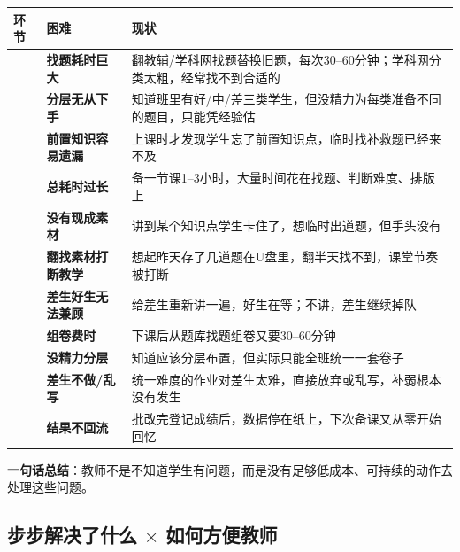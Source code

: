 \documentclass[11pt,a4paper]{article}
\begin{document}
\begin{center}\small
\begin{tabularx}{\textwidth}{>{\bfseries}l >{\bfseries}l Y}
\toprule
{}\textbf{环节} & \textbf{困难} & \textbf{现状} \\
\midrule
{} & 找题耗时巨大 & 翻教辅/学科网找题替换旧题，每次30--60分钟；学科网分类太粗，经常找不到合适的 \\
 & 分层无从下手 & 知道班里有好/中/差三类学生，但没精力为每类准备不同的题目，只能凭经验估 \\
 & 前置知识容易遗漏 & 上课时才发现学生忘了前置知识点，临时找补救题已经来不及 \\
 & 总耗时过长 & 备一节课1--3小时，大量时间花在找题、判断难度、排版上 \\
\midrule
{} & 没有现成素材 & 讲到某个知识点学生卡住了，想临时出道题，但手头没有 \\
 & 翻找素材打断教学 & 想起昨天存了几道题在U盘里，翻半天找不到，课堂节奏被打断 \\
 & 差生好生无法兼顾 & 给差生重新讲一遍，好生在等；不讲，差生继续掉队 \\
\midrule
{} & 组卷费时 & 下课后从题库找题组卷又要30--60分钟 \\
 & 没精力分层 & 知道应该分层布置，但实际只能全班统一一套卷子 \\
 & 差生不做/乱写 & 统一难度的作业对差生太难，直接放弃或乱写，补弱根本没有发生 \\
 & 结果不回流 & 批改完登记成绩后，数据停在纸上，下次备课又从零开始回忆 \\
\bottomrule
\end{tabularx}
\end{center}

\begin{notebox}
\textbf{一句话总结}：教师不是不知道学生有问题，而是没有足够低成本、可持续的动作去处理这些问题。
\end{notebox}

\subsection{步步解决了什么 $\times$ 如何方便教师}
\end{document}
